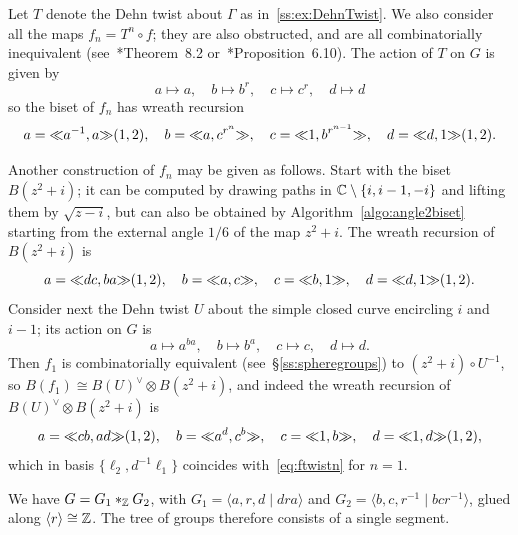 \documentclass{amsart}
\begin{document}
Let $T$ denote the Dehn twist about $\Gamma$ as
in~\ref{ss:ex:DehnTwist}. We also consider all the maps
$f_n=T^n\circ f$; they are also obstructed, and are all
combinatorially inequivalent
(see~\cite{pilgrim:combinations}*{Theorem~8.2}
or~\cite{bartholdi-n:thurston}*{Proposition~6.10}). The action of $T$
on $G$ is given by
\[a\mapsto a,\quad b\mapsto b^r,\quad c\mapsto c^r,\quad d\mapsto d\]
so the biset of $f_n$ has wreath recursion
\begin{equation}\label{eq:ftwistn}
  a={\ll}a^{-1},a{\gg}(1,2),\quad b={\ll}a,c^{r^n}{\gg},\quad c={\ll}1,b^{r^{n-1}}{\gg},\quad d={\ll}d,1{\gg}(1,2).
\end{equation}

Another construction of $f_n$ may be given as follows. Start with the
biset $B(z^2+i)$; it can be computed by drawing paths in
${\mathbb C}\setminus\{i,i-1,-i\}$ and lifting them by $\sqrt{z-i}$, but can
also be obtained by Algorithm~\ref{algo:angle2biset} starting from the
external angle $1/6$ of the map $z^2+i$. The wreath recursion of
$B(z^2+i)$ is
\[a={\ll}dc,b a{\gg}(1,2),\quad b={\ll}a,c{\gg},\quad c={\ll}b,1{\gg},\quad
d={\ll}d,1{\gg}(1,2).\]
Consider next the Dehn twist $U$ about the simple closed curve
encircling $i$ and $i-1$; its action on $G$ is
\[a\mapsto a^{b a},\quad b\mapsto b^a,\quad c\mapsto c,\quad d\mapsto d.
\]
Then $f_1$ is combinatorially equivalent (see~\S\ref{ss:spheregroups}) to
$(z^2+i)\circ U^{-1}$, so $B(f_1)\cong B(U)^\vee\otimes B(z^2+i)$, and
indeed the wreath recursion of $B(U)^\vee\otimes B(z^2+i)$ is
\[a={\ll}c b,ad{\gg}(1,2),\quad b={\ll}a^d,c^b{\gg},\quad c={\ll}1,b{\gg},\quad
d={\ll}1,d{\gg}(1,2),\]
which in basis $\{\ell_2,d^{-1}\ell_1\}$ coincides
with~\eqref{eq:ftwistn} for $n=1$.

We have $G=G_1*_{\mathbb Z} G_2$, with $G_1=\langle a,r,d\mid d r a\rangle$ and
$G_2=\langle b,c,r^{-1}\mid b c r^{-1}\rangle$, glued along $\langle
r\rangle\cong{\mathbb Z}$. The tree of groups therefore consists of a single
segment.
\end{document}
